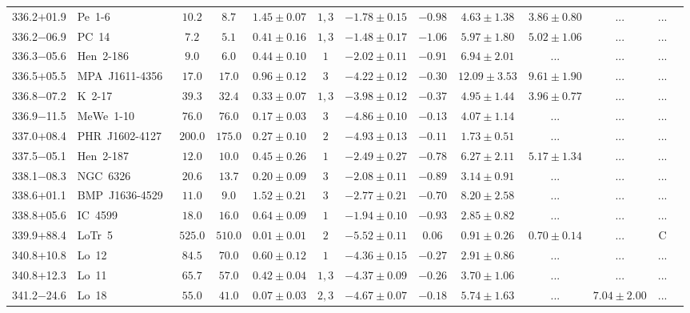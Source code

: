 \documentclass[useAMS]{mn2e}
\begin{document}
\begin{center}
{\begin{longtable}{llccccccccccc}
336.2$+$01.9&Pe~1-6&$      10.2$&$       8.7$&$1.45 \pm 0.07$&$1,3$&$-1.78 \pm 0.15$&$     -0.98$&$4.63 \pm 1.38$&$3.86 \pm 0.80$&$...$&...\\
336.2$-$06.9&PC~14&$       7.2$&$       5.1$&$0.41 \pm 0.16$&$1,3$&$-1.48 \pm 0.17$&$     -1.06$&$5.97 \pm 1.80$&$5.02 \pm 1.06$&$...$&...\\
336.3$-$05.6&Hen~2-186&$       9.0$&$       6.0$&$0.44 \pm 0.10$&$1$&$-2.02 \pm 0.11$&$     -0.91$&$6.94 \pm 2.01$&$...$&$...$&...\\
336.5$+$05.5&MPA~J1611-4356~&$      17.0$&$      17.0$&$0.96 \pm 0.12$&$3$&$-4.22 \pm 0.12$&$     -0.30$&$12.09 \pm 3.53$&$9.61 \pm 1.90$&$...$&...\\
336.8$-$07.2&K~2-17&$      39.3$&$      32.4$&$0.33 \pm 0.07$&$1,3$&$-3.98 \pm 0.12$&$     -0.37$&$4.95 \pm 1.44$&$3.96 \pm 0.77$&$...$&...\\
336.9$-$11.5&MeWe~1-10&$      76.0$&$      76.0$&$0.17 \pm 0.03$&$3$&$-4.86 \pm 0.10$&$     -0.13$&$4.07 \pm 1.14$&$...$&$...$&...\\
337.0$+$08.4&PHR~J1602-4127&$     200.0$&$     175.0$&$0.27 \pm 0.10$&$2$&$-4.93 \pm 0.13$&$     -0.11$&$1.73 \pm 0.51$&$...$&$...$&...\\
337.5$-$05.1&Hen~2-187&$      12.0$&$      10.0$&$0.45 \pm 0.26$&$1$&$-2.49 \pm 0.27$&$     -0.78$&$6.27 \pm 2.11$&$5.17 \pm 1.34$&$...$&...\\
338.1$-$08.3&NGC~6326&$      20.6$&$      13.7$&$0.20 \pm 0.09$&$3$&$-2.08 \pm 0.11$&$     -0.89$&$3.14 \pm 0.91$&$...$&$...$&...\\
338.6$+$01.1&BMP~J1636-4529&$      11.0$&$       9.0$&$1.52 \pm 0.21$&$3$&$-2.77 \pm 0.21$&$     -0.70$&$8.20 \pm 2.58$&$...$&$...$&...\\
338.8$+$05.6&IC~4599&$      18.0$&$      16.0$&$0.64 \pm 0.09$&$1$&$-1.94 \pm 0.10$&$     -0.93$&$2.85 \pm 0.82$&$...$&$...$&...\\
339.9$+$88.4&LoTr~5&$     525.0$&$     510.0$&$0.01 \pm 0.01$&$2$&$-5.52 \pm 0.11$&$      0.06$&$0.91 \pm 0.26$&$0.70 \pm 0.14$&$...$&C\\
340.8$+$10.8&Lo~12&$      84.5$&$      70.0$&$0.60 \pm 0.12$&$1$&$-4.36 \pm 0.15$&$     -0.27$&$2.91 \pm 0.86$&$...$&$...$&...\\
340.8$+$12.3&Lo~11&$      65.7$&$      57.0$&$0.42 \pm 0.04$&$1,3$&$-4.37 \pm 0.09$&$     -0.26$&$3.70 \pm 1.06$&$...$&$...$&...\\
341.2$-$24.6&Lo~18&$      55.0$&$      41.0$&$0.07 \pm 0.03$&$2,3$&$-4.67 \pm 0.07$&$     -0.18$&$5.74 \pm 1.63$&$...$&$7.04 \pm 2.00$&...\\

\end{longtable}}
\end{center}
\end{document}
